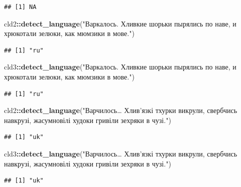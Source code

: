 \documentclass[
]{book}
\newenvironment{Shaded}{\begin{snugshade}}{\end{snugshade}}
\newcommand{\KeywordTok}[1]{\textcolor[rgb]{0.13,0.29,0.53}{\textbf{#1}}}
\newcommand{\NormalTok}[1]{#1}
\newcommand{\OperatorTok}[1]{\textcolor[rgb]{0.81,0.36,0.00}{\textbf{#1}}}
\newcommand{\StringTok}[1]{\textcolor[rgb]{0.31,0.60,0.02}{#1}}
\begin{document}
\begin{verbatim}
## [1] NA
\end{verbatim}

\begin{Shaded}
\begin{Highlighting}[]
\NormalTok{cld2}\OperatorTok{::}\KeywordTok{detect_language}\NormalTok{(}\StringTok{"Варкалось. Хливкие шорьки пырялись по наве, и хрюкотали зелюки, как мюмзики в мове."}\NormalTok{)}
\end{Highlighting}
\end{Shaded}

\begin{verbatim}
## [1] "ru"
\end{verbatim}

\begin{Shaded}
\begin{Highlighting}[]
\NormalTok{cld3}\OperatorTok{::}\KeywordTok{detect_language}\NormalTok{(}\StringTok{"Варкалось. Хливкие шорьки пырялись по наве, и хрюкотали зелюки, как мюмзики в мове."}\NormalTok{)}
\end{Highlighting}
\end{Shaded}

\begin{verbatim}
## [1] "ru"
\end{verbatim}

\begin{Shaded}
\begin{Highlighting}[]
\NormalTok{cld2}\OperatorTok{::}\KeywordTok{detect_language}\NormalTok{(}\StringTok{"Варчилось… Хлив'язкі тхурки викрули, свербчись навкрузі, жасумновілі худоки гривіли зехряки в чузі."}\NormalTok{)}
\end{Highlighting}
\end{Shaded}

\begin{verbatim}
## [1] "uk"
\end{verbatim}

\begin{Shaded}
\begin{Highlighting}[]
\NormalTok{cld3}\OperatorTok{::}\KeywordTok{detect_language}\NormalTok{(}\StringTok{"Варчилось… Хлив'язкі тхурки викрули, свербчись навкрузі, жасумновілі худоки гривіли зехряки в чузі."}\NormalTok{)}
\end{Highlighting}
\end{Shaded}

\begin{verbatim}
## [1] "uk"
\end{verbatim}
\end{document}
